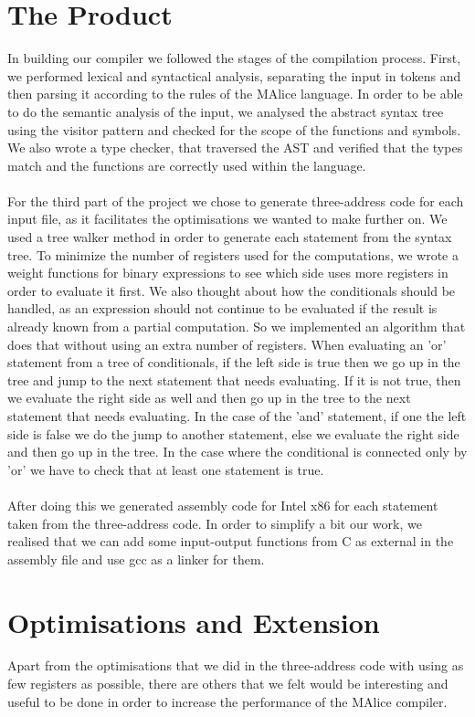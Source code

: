 \documentclass[a4wide, 11pt]{article}
\begin{document}
\section{The Product}
In building our compiler we followed the stages of the compilation process. First, we performed lexical and syntactical analysis, separating the input in tokens and then parsing it according to the rules of the MAlice language. In order to be able to do the semantic analysis of the input, we analysed the abstract syntax tree using the visitor pattern and checked for the scope of the functions and symbols. We also wrote a type checker, that traversed the AST and verified that the types match and the functions are correctly used within the language.
\\\\
For the third part of the project we chose to generate three-address code for each input file, as it facilitates the optimisations we wanted to make further on. We used a tree walker method in order to generate each statement from the syntax tree. To minimize the number of registers used for the computations, we wrote a weight functions for binary expressions to see which side uses more registers in order to evaluate it first. We also thought about how the conditionals should be handled, as an expression should not continue to be evaluated if the result is already known from a partial computation. So we implemented an algorithm that does that without using an extra number of registers. When evaluating an 'or' statement from a tree of conditionals, if the left side is true then we go up in the tree and jump to the next statement that needs evaluating. If it is not true, then we evaluate the right side as well and then go up in the tree to the next statement that needs evaluating. In the case of the 'and' statement, if one the left side is false we do the jump to another statement, else we evaluate the right side and then go up in the tree. In the case where the conditional is connected only by 'or' we have to check that at least one statement is true.
\\\\
After doing this we generated assembly code for Intel x86 for each statement taken from the three-address code. In order to simplify a bit our work, we realised that we can add some input-output functions from C as external in the assembly file and use gcc as a linker for them. 

\section{Optimisations and Extension}
Apart from the optimisations that we did in the three-address code with using as few registers as possible, there are others that we felt would be interesting and useful to be done in order to increase the performance of the MAlice compiler.
\end{document}
